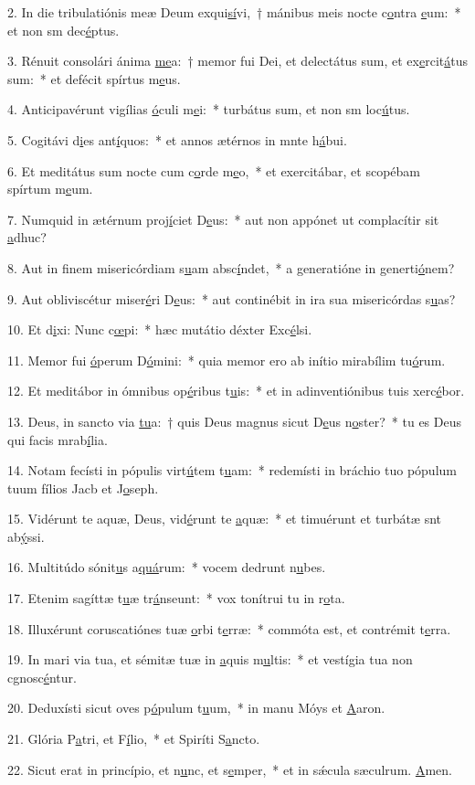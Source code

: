 2. In die tribulatiónis meæ Deum exqui\uline{sí}vi,~† mánibus meis nocte c\uline{o}ntra \uline{e}um:~* et non sm dec\uline{é}ptus.\par 
3. Rénuit consolári ánima \uline{me}a:~† memor fui Dei, et delectátus sum, et ex\uline{e}rcit\uline{á}tus sum:~* et defécit spírtus m\uline{e}us.\par 
4. Anticipavérunt vigílias \uline{ó}culi m\uline{e}i:~* turbátus sum, et non sm loc\uline{ú}tus.\par 
5. Cogitávi d\uline{i}es ant\uline{í}quos:~* et annos ætérnos in mnte h\uline{á}bui.\par 
6. Et meditátus sum nocte cum c\uline{o}rde m\uline{e}o,~* et exercitábar, et scopébam spírtum m\uline{e}um.\par 
7. Numquid in ætérnum proj\uline{í}ciet D\uline{e}us:~* aut non appónet ut complacítir sit \uline{a}dhuc?\par 
8. Aut in finem misericórdiam s\uline{u}am absc\uline{í}ndet,~* a generatióne in generti\uline{ó}nem?\par 
9. Aut obliviscétur miser\uline{é}ri D\uline{e}us:~* aut continébit in ira sua misericórdas s\uline{u}as?\par 
10. Et d\uline{i}xi: Nunc c\uline{œ}pi:~* hæc mutátio déxter Exc\uline{é}lsi.\par 
11. Memor fui \uline{ó}perum D\uline{ó}mini:~* quia memor ero ab inítio mirabílim tu\uline{ó}rum.\par 
12. Et meditábor in ómnibus op\uline{é}ribus t\uline{u}is:~* et in adinventiónibus tuis xerc\uline{é}bor.\par 
13. Deus, in sancto via \uline{tu}a:~† quis Deus magnus sicut D\uline{e}us n\uline{o}ster?~* tu es Deus qui facis mrab\uline{í}lia.\par 
14. Notam fecísti in pópulis virt\uline{ú}tem t\uline{u}am:~* redemísti in bráchio tuo pópulum tuum fílios Jacb et J\uline{o}seph.\par 
15. Vidérunt te aquæ, Deus, vid\uline{é}runt te \uline{a}quæ:~* et timuérunt et turbátæ snt ab\uline{ý}ssi.\par 
16. Multitúdo sónit\uline{u}s a\uline{quá}rum:~* vocem dedrunt n\uline{u}bes.\par 
17. Etenim sagíttæ t\uline{u}æ tr\uline{á}nseunt:~* vox tonítrui tu in r\uline{o}ta.\par 
18. Illuxérunt coruscatiónes tuæ \uline{o}rbi t\uline{e}rræ:~* commóta est, et contrémit t\uline{e}rra.\par 
19. In mari via tua, et sémitæ tuæ in \uline{a}quis m\uline{u}ltis:~* et vestígia tua non cgnosc\uline{é}ntur.\par 
20. Deduxísti sicut oves p\uline{ó}pulum t\uline{u}um,~* in manu Móys et \uline{A}aron.\par 
21. Glória P\uline{a}tri, et F\uline{í}lio,~* et Spiríti S\uline{a}ncto.\par 
22. Sicut erat in princípio, et n\uline{u}nc, et s\uline{e}mper,~* et in sǽcula sæculrum. \uline{A}men.\par 
